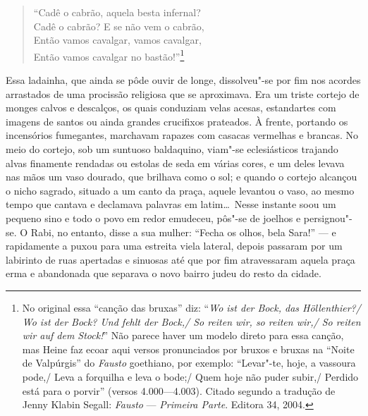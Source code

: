 \begin{verse}
``Cadê o cabrão, aquela besta infernal?\\
Cadê o cabrão? E se não vem o cabrão,\\
Então vamos cavalgar, vamos cavalgar,\\
Então vamos cavalgar no bastão!''\footnote{ No
original essa ``canção das bruxas'' diz: ``\textit{{\A Wo ist der Bock, das
Höllenthier?/ Wo ist der Bock? Und fehlt der Bock,/ So reiten
wir, so reiten wir,/ So reiten wir auf dem Stock!}}'' Não parece haver um
modelo direto para essa canção, mas Heine faz ecoar aqui versos
pronunciados por bruxos e bruxas na ``Noite de Valpúrgis'' do
\textit{Fausto} goethiano, por exemplo: ``Levar"-te, hoje, a vassoura
pode,/ Leva a forquilha e leva o bode;/ Quem hoje não puder subir,/
Perdido está para o porvir'' (versos 4.000---4.003). Citado segundo a
tradução de Jenny Klabin Segall: \textit{Fausto }--- \textit{Primeira
Parte}. Editora 34, 2004.}
\end{verse}

Essa ladainha, que ainda se pôde ouvir de longe, dissolveu"-se por fim
nos acordes arrastados de uma procissão religiosa que se aproximava.
Era um triste cortejo de monges calvos e descalços, os quais conduziam
velas acesas, estandartes com imagens de santos ou ainda grandes
crucifixos prateados. À frente, portando os incensórios fumegantes,
marchavam rapazes com casacas vermelhas e brancas. No meio do cortejo,
sob um suntuoso baldaquino, viam"-se eclesiásticos trajando alvas
finamente rendadas ou estolas de seda em várias cores, e um deles
levava nas mãos um vaso dourado, que brilhava como o sol; e quando o
cortejo alcançou o nicho sagrado, situado a um canto da praça, aquele
levantou o vaso, ao mesmo tempo que cantava e declamava palavras em
latim\ldots\ Nesse instante soou um pequeno sino e todo o povo em redor
emudeceu, pôs"-se de joelhos e persignou"-se. O Rabi, no entanto,
disse a sua mulher: ``Fecha os olhos, bela Sara!'' --- e rapidamente a
puxou para uma estreita viela lateral, depois passaram por um labirinto
de ruas apertadas e sinuosas até que por fim atravessaram aquela praça
erma e abandonada que separava o novo bairro judeu do resto da cidade.


